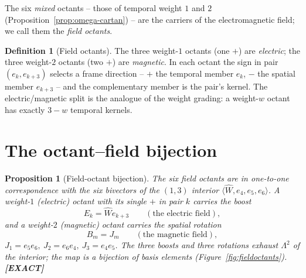 \documentclass[11pt,oneside]{book}
\newcommand{\Wh}{\hat{W}}                         %
\newcommand{\status}[1]{{\sffamily\bfseries\color{statuscol}[#1]}}
\theoremstyle{plain}
\newtheorem{proposition}[theorem]{Proposition}
\theoremstyle{definition}
\newtheorem{definition}[theorem]{Definition}
\theoremstyle{remark}
\begin{document}
The six \emph{mixed} octants -- those of temporal weight $1$ and $2$
(Proposition~\ref{prop:omega-cartan}) -- are the carriers of the electromagnetic
field; we call them the \emph{field octants}.

\begin{definition}[Field octants]
\label{def:field-octants}
The three weight-$1$ octants (one $+$) are \emph{electric}; the three weight-$2$
octants (two $+$) are \emph{magnetic}. In each octant the sign in pair
$(e_k,e_{k+3})$ selects a frame direction -- $+$ the temporal member $e_k$, $-$ the
spatial member $e_{k+3}$ -- and the complementary member is the pair's kernel. The
electric/magnetic split is the analogue of the weight grading: a weight-$w$ octant
has exactly $3-w$ temporal kernels.
\end{definition}

\section{The octant--field bijection}
\label{sec:bijection}

\begin{proposition}[Field-octant bijection]
\label{prop:fieldbijection}
The six field octants are in one-to-one correspondence with the six bivectors of the
$(1,3)$ interior $\langle\Wh,e_4,e_5,e_6\rangle$. A weight-$1$ (electric) octant with
its single $+$ in pair $k$ carries the boost
\[
  E_k=\Wh e_{k+3}\qquad(\text{the electric field}),
\]
and a weight-$2$ (magnetic) octant carries the spatial rotation
\[
  B_m=J_m\qquad(\text{the magnetic field}),
\]
$J_1=e_5e_6,\ J_2=e_6e_4,\ J_3=e_4e_5$. The three boosts and three rotations exhaust
$\Lambda^2$ of the interior; the map is a bijection of basis elements
(Figure~\ref{fig:fieldoctants}). \status{EXACT}
\end{proposition}
\end{document}
